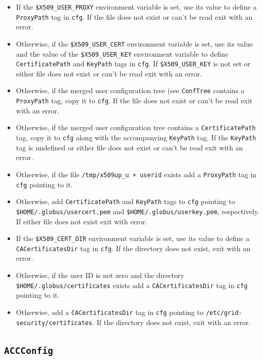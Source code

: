 \documentclass{book}
\newcommand{\ACCConfig}{\texttt{ACCConfig}}
\begin{document}
\begin{itemize}
\item{If the \texttt{\$X509\_USER\_PROXY} environment variable is set,
  use its value to define a \texttt{ProxyPath} tag in \texttt{cfg}. If
  the file does not exist or can't be read exit with an error.}
\item{Otherwise, if the \texttt{\$X509\_USER\_CERT} environment
  variable is set, use its value and the value of the
  \texttt{\$X509\_USER\_KEY} environment variable to define
  \texttt{CertificatePath} and \texttt{KeyPath} tags in \texttt{cfg}.
  If \texttt{\$X509\_USER\_KEY} is not set or either file does not
  exist or can't be read exit with an error.}
\item{Otherwise, if the merged user configuration tree (see
  \texttt{ConfTree} contains a \texttt{ProxyPath} tag, copy it to
  \texttt{cfg}. If the file does not exist or can't be read exit with
  an error.}
\item{Otherwise, if the merged user configuration tree contains a
  \texttt{CertificatePath} tag, copy it to \texttt{cfg} along with the
  accompanying \texttt{KeyPath} tag. If the \texttt{KeyPath} tag is
  undefined or either file does not exist or can't be read exit with
  an error.}
\item{Otherwise, if the file \texttt{/tmp/x509up\_u + userid} exists
  add a \texttt{ProxyPath} tag in \texttt{cfg} pointing to it.}
\item{Otherwise, add \texttt{CertificatePath} and \texttt{KeyPath}
  tags to \texttt{cfg} pointing to
  \texttt{\$HOME/.globus/usercert.pem} and
  \texttt{\$HOME/.globus/userkey.pem}, respectively. If either file
  does not exist exit with error.}
\item{If the \texttt{\$X509\_CERT\_DIR} environment variable is set,
  use its value to define a \texttt{CACertificatesDir} tag in
  \texttt{cfg}. If the directory does not exist, exit with an error.}
\item{Otherwise, if the user ID is not zero and the directory
  \texttt{\$HOME/.globus/certificates} exists add a
  \texttt{CACertificatesDir} tag in \texttt{cfg} pointing to it.}
\item{Otherwise, add a \texttt{CACertificatesDir} tag in \texttt{cfg}
  pointing to \texttt{/etc/grid-security/certificates}. If the
  directory does not exist, exit with an error.}
\end{itemize}

\subsection{{\ACCConfig}}
\end{document}
